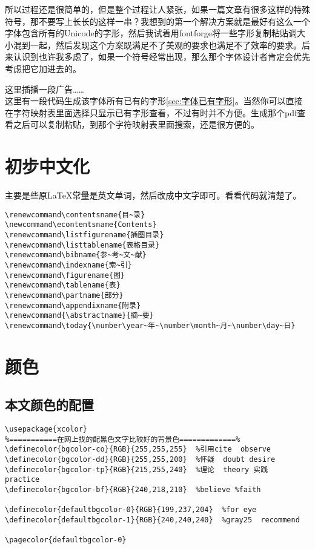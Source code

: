 \begin{fancycolorbox}
所以过程还是很简单的，但是整个过程让人紧张，如果一篇文章有很多这样的特殊符号，那不要写上长长的这样一串？我想到的第一个解决方案就是最好有这么一个字体包含所有的Unicode的字形，然后我试着用fontforge将一些字形复制粘贴调大小混到一起，然后发现这个方案既满足不了美观的要求也满足不了效率的要求。后来认识到也许我多虑了，如果一个符号经常出现，那么那个字体设计者肯定会优先考虑把它加进去的。
\end{fancycolorbox}

这里插播一段广告……\\
这里有一段代码生成该字体所有已有的字形\ref{sec:字体已有字形}。当然你可以直接在字符映射表里面选择只显示已有字形查看，不过有时并不方便。生成那个pdf查看之后可以复制粘贴，到那个字符映射表里面搜索，还是很方便的。


\section{初步中文化}
主要是些原\LaTeX 常量是英文单词，然后改成中文字即可。看看代码就清楚了。
\begin{verbatim}
\renewcommand\contentsname{目~录}
\newcommand\econtentsname{Contents}
\renewcommand\listfigurename{插图目录}
\renewcommand\listtablename{表格目录}
\renewcommand\bibname{参~考~文~献}
\renewcommand\indexname{索~引}
\renewcommand\figurename{图}
\renewcommand\tablename{表}
\renewcommand\partname{部分}
\renewcommand\appendixname{附录}
\renewcommand{\abstractname}{摘~要}
\renewcommand\today{\number\year~年~\number\month~月~\number\day~日}
\end{verbatim}


\section{颜色}
\label{sec:颜色}

\subsection{本文颜色的配置}
\begin{verbatim}
\usepackage{xcolor}  
%===========在网上找的配黑色文字比较好的背景色=============%
\definecolor{bgcolor-co}{RGB}{255,255,255}  %引用cite  observe
\definecolor{bgcolor-dd}{RGB}{255,255,200}  %怀疑  doubt desire 
\definecolor{bgcolor-tp}{RGB}{215,255,240}  %理论  theory 实践  practice
\definecolor{bgcolor-bf}{RGB}{240,218,210}  %believe %faith

\definecolor{defaultbgcolor-0}{RGB}{199,237,204}  %for eye
\definecolor{defaultbgcolor-1}{RGB}{240,240,240}  %gray25  recommend

\pagecolor{defaultbgcolor-0}
\end{verbatim}

